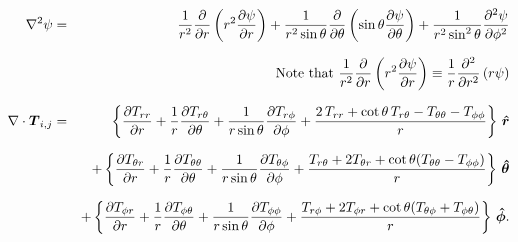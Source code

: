 \begin{eqnarray}
\nabla^{2}\psi &=& \frac{1}{r^{2}}\frac{\partial}{\partial r}\left( r^{2} \frac{\partial \psi}{\partial r} \right) 
                 + \frac{1}{r^{2} \st}\frac{\partial}{\partial \theta}\left( \st \frac{\partial \psi}{\partial \theta} \right) 
                 + \frac{1}{r^{2} \sin^{2}\theta}\frac{\partial^{2} \psi}{\partial \phi^{2}} \nonumnext
&& \textrm{Note that}~\frac{1}{r^{2}}\frac{\partial}{\partial r}\left( r^{2}\frac{\partial \psi}{\partial r} \right) \equiv
                      \frac{1}{r}\frac{\partial^{2}}{\partial r^{2}}\left( r \psi \right) \nonumnext
    \nabla \cdot \boldT_{i,j} &=& 
    \left\{ \frac{\partial T_{rr}}{\partial r} + \frac{1}{r}\frac{\partial T_{r\theta}}{\partial \theta} 
    + \frac{1}{r\st}\frac{\partial T_{r\phi}}{\partial \phi} 
    + \frac{2\,T_{rr}+\cot{\theta}\,T_{r\theta}-T_{\theta\theta}-T_{\phi\phi}}{r}  \right\}\,\urr \nonumnext 
    &&+ \left\{ \frac{\partial T_{\theta r}}{\partial r} + \frac{1}{r}\frac{\partial T_{\theta\theta}}{\partial \theta} 
    + \frac{1}{r\st}\frac{\partial T_{\theta\phi}}{\partial \phi} 
    + \frac{T_{r\theta}+2T_{\theta r}+\cot{\theta}(T_{\theta\theta}-T_{\phi\phi})}{r}  \right\}\,\ut  \nonumnext
    &&+ \left\{ \frac{\partial T_{\phi r}}{\partial r} + \frac{1}{r}\frac{\partial T_{\phi\theta}}{\partial \theta} 
    + \frac{1}{r\st}\frac{\partial T_{\phi\phi}}{\partial \phi} 
    + \frac{T_{r\phi}+2T_{\phi r}+\cot{\theta}(T_{\theta\phi}+T_{\phi\theta})}{r}  \right\}\,\up.  \nonumber 
\end{eqnarray}
